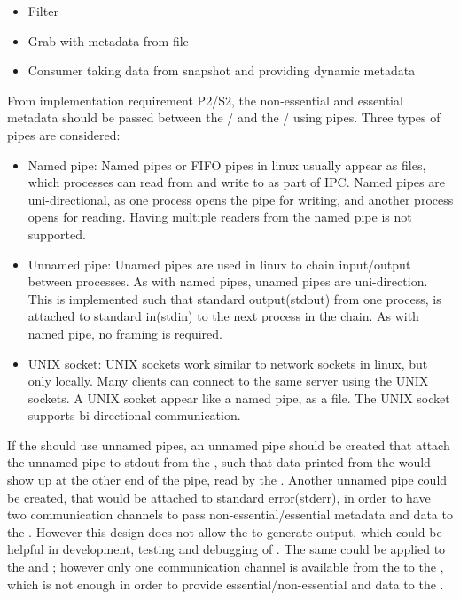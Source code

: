 \begin{itemize}
	\item Filter
	\item Grab with metadata from file
	\item Consumer taking data from snapshot and providing dynamic metadata
\end{itemize}


From implementation requirement P2/S2, the non-essential and essential metadata should be passed between the \pub{}/\sub{} and the \con{}/\pro{} using pipes. Three types of pipes are considered:
\begin{itemize}
	\item Named pipe: Named pipes or FIFO pipes in linux usually appear as files, which processes can read from and write to as part of \ac{IPC}. Named pipes are uni-directional, as one process opens the pipe for writing, and another process opens for reading. Having multiple readers from the named pipe is not supported.
	
	\item Unnamed pipe: Unamed pipes are used in linux to chain input/output between processes. As with named pipes, unamed pipes are uni-direction. This is implemented such that standard output(stdout) from one process, is attached to standard in(stdin) to the next process in the chain. As with named pipe, no framing is required.
	
	\item UNIX socket: UNIX sockets work similar to network sockets in linux, but only locally. Many clients can connect to the same server using the UNIX sockets. A UNIX socket appear like a named pipe, as a file. The UNIX socket supports bi-directional communication. 
\end{itemize}

If the \pub{} should use unnamed pipes, an unnamed pipe should be created that attach the unnamed pipe to stdout from the \pro{}, such that data printed from the \pro{} would show up at the other end of the pipe, read by the \pub{}. Another unnamed pipe could be created, that would be attached to standard error(stderr), in order to have two communication channels to pass non-essential/essential metadata and data to the \pub{}. However this design does not allow the \pro{} to generate output, which could be helpful in development, testing and debugging of \cons{}. The same could be applied to the \sub{} and \con{}; however only one communication channel is available from the \sub{} to the \con{}, which is not enough in order to provide essential/non-essential and data to the \con{}.

